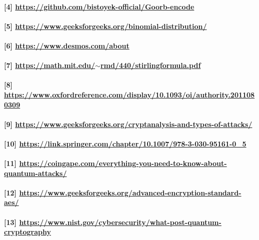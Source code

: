 \documentclass[oneside]{book}
\newcommand{\myparagraph}[1]{\paragraph{\textnormal{#1}}}
\begin{document}
\myparagraph{
[4] \href{https://github.com/bistoyek-official/Goorb-encode}{https://github.com/bistoyek-official/Goorb-encode}
}

\myparagraph{
[5] \href{https://www.geeksforgeeks.org/binomial-distribution/}{https://www.geeksforgeeks.org/binomial-distribution/}
}

\myparagraph{
[6] \href{https://www.desmos.com/about}{https://www.desmos.com/about}
}

\myparagraph{
[7] \href{https://math.mit.edu/~rmd/440/stirlingformula.pdf}{https://math.mit.edu/$\sim$rmd/440/stirlingformula.pdf}
}

\myparagraph{
[8] \href{https://www.oxfordreference.com/display/10.1093/oi/authority.20110803095508254}{https://www.oxfordreference.com/display/10.1093/oi/authority.2011080309\newline 254}
}

\myparagraph{
[9] \href{https://www.geeksforgeeks.org/cryptanalysis-and-types-of-attacks/}{https://www.geeksforgeeks.org/cryptanalysis-and-types-of-attacks/}
}

\myparagraph{
[10] \href{https://link.springer.com/chapter/10.1007/978-3-030-95161-0_5}{https://link.springer.com/chapter/10.1007/978-3-030-95161-0\_5}
}

\myparagraph{
[11] \href{https://coingape.com/everything-you-need-to-know-about-quantum-attacks/}{https://coingape.com/everything-you-need-to-know-about-quantum-attack\newline s/}
}

\myparagraph{
[12] \href{https://www.geeksforgeeks.org/advanced-encryption-standard-aes/}{https://www.geeksforgeeks.org/advanced-encryption-standard-aes/}}

\myparagraph{
[13] \href{https://www.nist.gov/cybersecurity/what-post-quantum-cryptography}{https://www.nist.gov/cybersecurity/what-post-quantum-cryptography}
}
\end{document}
